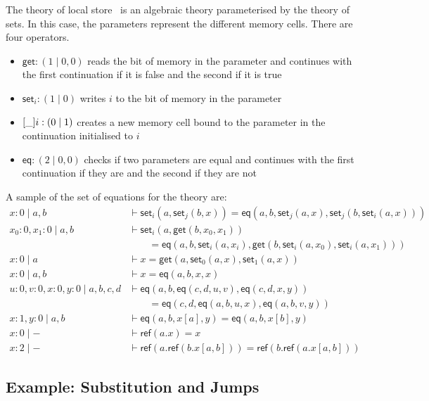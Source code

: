 \documentclass{scrartcl}
\theoremstyle{definition}
\begin{document}
\newcommand{\get}{\mathsf{get}}
\newcommand{\set}[1]{\mathsf{set}_{#1}}
\newcommand{\eq}{\mathsf{eq}}
\newcommand{\rf}{\mathsf{ref}}

The theory of local store~\cite{staton_instances_2013} is an algebraic theory parameterised by the theory of sets. In this case, the parameters represent the different memory cells. There are four operators.
\begin{itemize}
    \item $\get : (1\mid 0, 0)$ reads the bit of memory in the parameter and continues with the first continuation if it is false and the second if it is true
    \item $\set{i} : (1 \mid 0)$ writes $i$ to the bit of memory in the parameter
    \item $\ref_i : (0 \mid 1)$ creates a new memory cell bound to the parameter in the continuation initialised to $i$
    \item $\eq : (2\mid 0, 0)$ checks if two parameters are equal and continues with the first continuation if they are and the second if they are not
\end{itemize}

A sample of the set of equations for the theory are:
\begin{align*}
    x: 0 \mid a, b &\vdash \set i(a,\set j(b, x)) = \eq(a,b, \set j(a, x), \set j(b, \set i(a,x))) \\
    x_0:0,x_1:0\mid a,b &\vdash \set i(a, \get(b, x_0,x_1)) \\
    &\qquad = \eq(a,b, \set i(a, x_i), \get(b , \set i(a, x_0), \set i(a, x_1))) \\
    x:0 \mid a &\vdash x = \get(a, \set 0(a, x), \set 1(a, x)) \\
    x:0 \mid a,b &\vdash x = \eq(a,b, x,x) \\
    u:0,v:0,x:0,y:0\mid a,b,c,d &\vdash \eq(a,b , \eq(c,d , u,v), \eq(c,d , x,y)) \\
    &\qquad = \eq(c,d, \eq(a,b, u,x), \eq(a,b, v,y)) \\
    x:1,y:0 \mid a,b &\vdash \eq(a,b, x[a],y) = \eq(a,b, x[b],y) \\
    x: 0 \mid - &\vdash \rf(a.x) = x \\
    x: 2 \mid - &\vdash \rf(a.\rf(b.x[a,b])) = \rf(b.\rf(a.x[a,b]))
\end{align*}

\subsection{Example: Substitution and Jumps}
\end{document}
